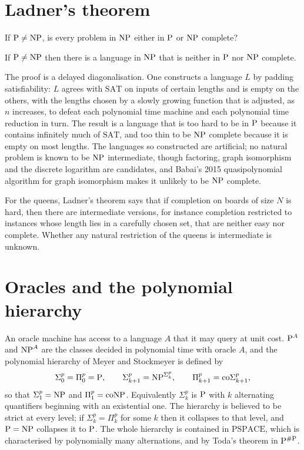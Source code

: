 \section{Ladner's theorem}

If $\mathrm{P} \neq \mathrm{NP}$, is every problem in $\mathrm{NP}$ either in $\mathrm{P}$ or $\mathrm{NP}$ complete?

\begin{theorem}[Ladner]
If $\mathrm{P} \neq \mathrm{NP}$ then there is a language in $\mathrm{NP}$ that is neither in $\mathrm{P}$ nor $\mathrm{NP}$ complete.
\end{theorem}

The proof is a delayed diagonalisation. One constructs a language $L$ by padding satisfiability: $L$ agrees with $\mathrm{SAT}$ on inputs of certain lengths and is empty on the others, with the lengths chosen by a slowly growing function that is adjusted, as $n$ increases, to defeat each polynomial time machine and each polynomial time reduction in turn. The result is a language that is too hard to be in $\mathrm{P}$ because it contains infinitely much of $\mathrm{SAT}$, and too thin to be $\mathrm{NP}$ complete because it is empty on most lengths. The languages so constructed are artificial; no natural problem is known to be $\mathrm{NP}$ intermediate, though factoring, graph isomorphism and the discrete logarithm are candidates, and Babai's 2015 quasipolynomial algorithm for graph isomorphism makes it unlikely to be $\mathrm{NP}$ complete.

For the queens, Ladner's theorem says that if completion on boards of size $N$ is hard, then there are intermediate versions, for instance completion restricted to instances whose length lies in a carefully chosen set, that are neither easy nor complete. Whether any natural restriction of the queens is intermediate is unknown.

\section{Oracles and the polynomial hierarchy}

An oracle machine has access to a language $A$ that it may query at unit cost. $\mathrm{P}^A$ and $\mathrm{NP}^A$ are the classes decided in polynomial time with oracle $A$, and the polynomial hierarchy of Meyer and Stockmeyer is defined by
\[
\Sigma_0^p = \Pi_0^p = \mathrm{P} , \qquad \Sigma_{k+1}^p = \mathrm{NP}^{\Sigma_k^p} , \qquad \Pi_{k+1}^p = \mathrm{co}\Sigma_{k+1}^p ,
\]
so that $\Sigma_1^p = \mathrm{NP}$ and $\Pi_1^p = \mathrm{co}\mathrm{NP}$. Equivalently $\Sigma_k^p$ is $\mathrm{P}$ with $k$ alternating quantifiers beginning with an existential one. The hierarchy is believed to be strict at every level; if $\Sigma_k^p = \Pi_k^p$ for some $k$ then it collapses to that level, and $\mathrm{P} = \mathrm{NP}$ collapses it to $\mathrm{P}$. The whole hierarchy is contained in $\mathrm{PSPACE}$, which is characterised by polynomially many alternations, and by Toda's theorem in $\mathrm{P}^{\#\mathrm{P}}$.

